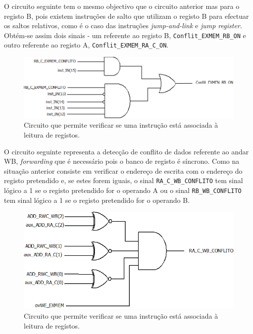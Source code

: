 \documentclass[11pt]{article}
\numberwithin{equation}{section}
\begin{document}
O circuito seguinte tem o mesmo objectivo que o circuito anterior mas para o registo B, pois existem instruções de salto que utilizam o registo B para efectuar os saltos relativos, como é o caso das instruções \textit{jump-and-link} e \textit{jump register}. Obtém-se assim dois sinais - um referente ao registo B, \texttt{Conflit\_EXMEM\_RB\_ON} e outro referente ao registo A, \texttt{Conflit\_EXMEM\_RA\_C\_ON}.
\begin{figure}[H]
	\centering
	\includegraphics[keepaspectratio=true, scale=0.27]{imagens/DetecaodeconflitoEXMEMRB}
	\vspace{-0.5em}
	\caption{Circuito que permite verificar se uma instrução está associada à leitura de registos.}
	\vspace{-0.8em}
\end{figure} 

O circuito seguinte representa a detecção de conflito de dados referente ao andar WB, \textit{forwarding} que é necessário pois o banco de registo é síncrono. Como na situação anterior consiste em verificar o endereço de escrita com o endereço do registo pretendido e, se estes forem iguais, o sinal \texttt{RA\_C\_WB\_CONFLITO} tem sinal lógico a 1 se o registo pretendido for o operando A ou o sinal \texttt{RB\_WB\_CONFLITO} tem sinal lógico a 1 se o registo pretendido for o operando B.

\begin{figure}[H]
	\centering
	\includegraphics[keepaspectratio=true, scale=0.27]{imagens/DetecaodeconflitoWB}
	\vspace{-0.5em}
	\caption{Circuito que permite verificar se uma instrução está associada à leitura de registos.}
	\vspace{-0.8em}
\end{figure} 
\end{document}
